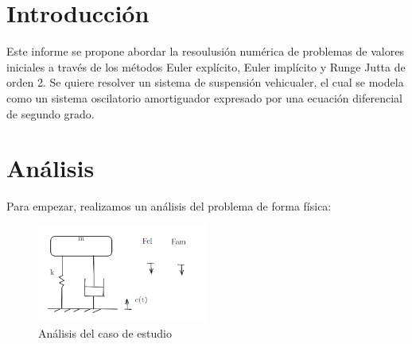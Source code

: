 \section{Introducción}
Este informe se propone abordar la resoulusión numérica de problemas de valores iniciales a través de los métodos Euler explícito, Euler implícito y Runge Jutta de orden 2. Se quiere resolver un sistema de suspensión vehicualer, el cual se modela como un sistema oscilatorio amortiguador expresado por una ecuación diferencial de segundo grado.
\section{Análisis}
Para empezar, realizamos un análisis del problema de forma física:
\begin{figure}[h] 
    \centering
    \includegraphics[width=0.5\textwidth]{imagenes/analisis.png}
    \caption{Análisis del caso de estudio}
    \label{fig:figura1}
\end{figure}

